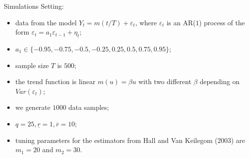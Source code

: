 \documentclass[10pt]{beamer}
\begin{document}
\begin{frame}{Simulations}
Setting:
\begin{itemize}
\item data from the model $Y_t = m(t/T) + \varepsilon_t$, where $\varepsilon_t$ is an AR($1$) process of the form $\varepsilon_t = a_1 \varepsilon_{t-1} + \eta_t$;
\item $a_1 \in \{ -0.95, -0.75, -0.5, -0.25, 0.25, 0.5, 0.75, 0.95\}$;
\item sample size $T$ is $500$;
\item the trend function is linear $m(u) = \beta u$ with two different $\beta$ depending on $Var(\varepsilon_t)$;
\item we generate $1000$ data samples;
\item $q=25, \underline{r} = 1, \overline{r} = 10$;
\item tuning parameters for the estimators from Hall and Van Keilegom (2003) are $m_1 = 20$ and $m_2 = 30$. 
\end{itemize}

\end{frame}
\end{document}
